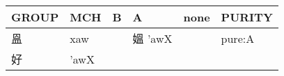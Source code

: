 \documentclass[14pt,a4paper]{scrartcl}
\begin{document}
\begin{longtable}[c]{@{}llllll@{}}
\toprule
\begin{minipage}[b]{0.14\columnwidth}\raggedright\strut
GROUP
\strut\end{minipage} &
\begin{minipage}[b]{0.14\columnwidth}\raggedright\strut
MCH
\strut\end{minipage} &
\begin{minipage}[b]{0.14\columnwidth}\raggedright\strut
B
\strut\end{minipage} &
\begin{minipage}[b]{0.14\columnwidth}\raggedright\strut
A
\strut\end{minipage} &
\begin{minipage}[b]{0.14\columnwidth}\raggedright\strut
none
\strut\end{minipage} &
\begin{minipage}[b]{0.14\columnwidth}\raggedright\strut
PURITY
\strut\end{minipage}\tabularnewline
\midrule
\endhead
\begin{minipage}[t]{0.14\columnwidth}\raggedright\strut
𥁕
\strut\end{minipage} &
\begin{minipage}[t]{0.14\columnwidth}\raggedright\strut
xaw
\strut\end{minipage} &
\begin{minipage}[t]{0.14\columnwidth}\raggedright\strut
\strut\end{minipage} &
\begin{minipage}[t]{0.14\columnwidth}\raggedright\strut
媼 'awX
\strut\end{minipage} &
\begin{minipage}[t]{0.14\columnwidth}\raggedright\strut
\strut\end{minipage} &
\begin{minipage}[t]{0.14\columnwidth}\raggedright\strut
pure:A
\strut\end{minipage}\tabularnewline
\begin{minipage}[t]{0.14\columnwidth}\raggedright\strut
好
\strut\end{minipage} &
\begin{minipage}[t]{0.14\columnwidth}\raggedright\strut
'awX
\strut\end{minipage} &
\begin{minipage}[t]{0.14\columnwidth}\raggedright\strut
\strut\end{minipage} &
\begin{minipage}[t]{0.14\columnwidth}\raggedright\strut

\end{minipage}
\end{longtable}
\end{document}
